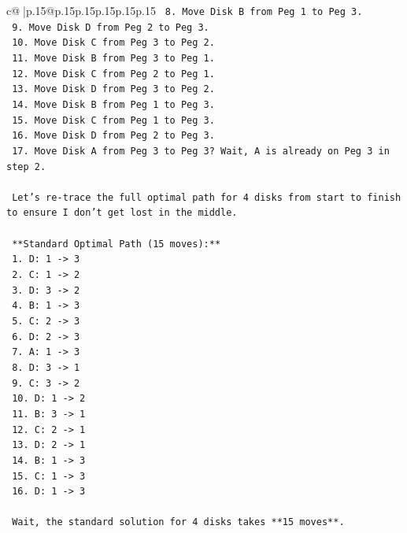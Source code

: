 \documentclass{article}
\begin{document}
{\begin{supertabular}{c@{$\;$}|p{.15\linewidth}@{}p{.15\linewidth}p{.15\linewidth}p{.15\linewidth}p{.15\linewidth}p{.15\linewidth}}
{{{\texttt{    8.  Move Disk B from Peg 1 to Peg 3.} \\
\texttt{    9.  Move Disk D from Peg 2 to Peg 3.} \\
\texttt{    10. Move Disk C from Peg 3 to Peg 2.} \\
\texttt{    11. Move Disk B from Peg 3 to Peg 1.} \\
\texttt{    12. Move Disk C from Peg 2 to Peg 1.} \\
\texttt{    13. Move Disk D from Peg 3 to Peg 2.} \\
\texttt{    14. Move Disk B from Peg 1 to Peg 3.} \\
\texttt{    15. Move Disk C from Peg 1 to Peg 3.} \\
\texttt{    16. Move Disk D from Peg 2 to Peg 3.} \\
\texttt{    17. Move Disk A from Peg 3 to Peg 3? Wait, A is already on Peg 3 in step 2.} \\
\\ 
\texttt{    Let's re{-}trace the full optimal path for 4 disks from start to finish to ensure I don't get lost in the middle.} \\
\\ 
\texttt{    **Standard Optimal Path (15 moves):**} \\
\texttt{    1.  D: 1 {-}> 3} \\
\texttt{    2.  C: 1 {-}> 2} \\
\texttt{    3.  D: 3 {-}> 2} \\
\texttt{    4.  B: 1 {-}> 3} \\
\texttt{    5.  C: 2 {-}> 3} \\
\texttt{    6.  D: 2 {-}> 3} \\
\texttt{    7.  A: 1 {-}> 3} \\
\texttt{    8.  D: 3 {-}> 1} \\
\texttt{    9.  C: 3 {-}> 2} \\
\texttt{    10. D: 1 {-}> 2} \\
\texttt{    11. B: 3 {-}> 1} \\
\texttt{    12. C: 2 {-}> 1} \\
\texttt{    13. D: 2 {-}> 1} \\
\texttt{    14. B: 1 {-}> 3} \\
\texttt{    15. C: 1 {-}> 3} \\
\texttt{    16. D: 1 {-}> 3} \\
\\ 
\texttt{    Wait, the standard solution for 4 disks takes **15 moves**.} \\
}}}
\end{supertabular}}
\end{document}
